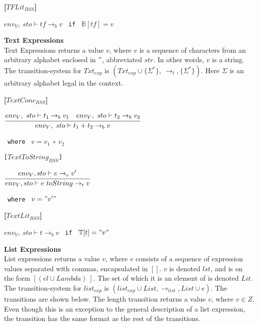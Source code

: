 {\textbf{[$TFLit_{BSS}$]}\\
\begin{center}
	\begin{math}
	env_V,\ sto \vdash tf \rightarrow_b v
	\end{math}
	\texttt{ if } $\mathbb{B}[tf] = v$
\end{center}

\textbf{\large{Text Expressions}}\\
Text Expressions returns a value $v$, where $v$ is a sequence of characters from an arbitrary alphabet enclosed in $"$, abbreviated $str$.
In other words, $v$ is a string.
The transition-system for $Txt_{exp}$ is $(Txt_{exp} \cup \{\Sigma^*\},\ \rightarrow_t, \{\Sigma^*\})$.
Here $\Sigma$ is an arbitrary alphabet legal in the context.

\textbf{[$TextConc_{BSS}$]}\\
\begin{center}
	\begin{math}
	\cfrac
		{env_V,\ sto \vdash t_1 \rightarrow_b v_1 \quad env_V,\ sto \vdash t_2 \rightarrow_b v_2}
		{env_V,\ sto \vdash t_1 + t_2 \rightarrow_b v}
	\end{math}
	
	\texttt{ where } $v = v_1\ \circ\ v_2$
\end{center}

\texttt{[$TextToString_{BSS}$]}\\
\begin{center}
	\begin{math}
		\cfrac
			{env_V, sto \vdash e \rightarrow_{e} v'}
			{env_V, sto \vdash e\ toString \rightarrow_{t} v}
	\end{math}
	
	\texttt{ where } $v = "v'"$
\end{center}

\textbf{[$TextLit_{BSS}$]}\\
\begin{center}
	\begin{math}
	env_V,\ sto \vdash t \rightarrow_b v
	\end{math}
	\texttt{ if } $\mathbb{T}[t] = "v"$
\end{center}

\textbf{\Large{List Expressions}}\\
List expressions returns a value $v$, where $v$ consists of a sequence of expression values separated with commas, encapsulated in $[]$.
$v$ is denoted $lst$, and is on the form $[(el \cup Lambda)~]$.
The set of which it is an element of is denoted $Lit$.
The transition-system for $list_{exp}$ is $(list_{exp} \cup List, \rightarrow_{list}, List \cup e)$.
The transitions are shown below.
The length transition returns a value $v$, where $v \in Z$.
Even though this is an exception to the general description of a list expression, the transition has the same format as the rest of the transitions.

}
